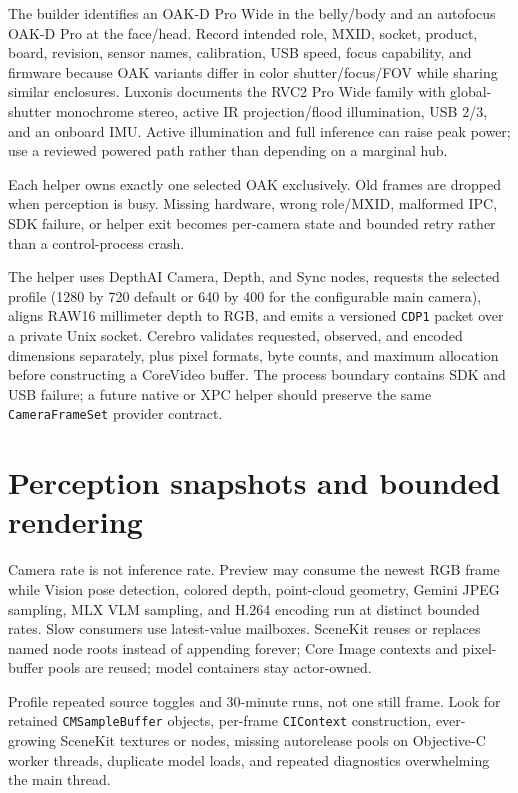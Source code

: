 \documentclass[10pt,openany]{book}
\begin{document}
The builder identifies an OAK-D Pro Wide in the belly/body and an autofocus OAK-D Pro at the face/head. Record intended role, MXID, socket, product, board, revision, sensor names, calibration, USB speed, focus capability, and firmware because OAK variants differ in color shutter/focus/FOV while sharing similar enclosures. Luxonis documents the RVC2 Pro Wide family with global-shutter monochrome stereo, active IR projection/flood illumination, USB 2/3, and an onboard IMU. Active illumination and full inference can raise peak power; use a reviewed powered path rather than depending on a marginal hub.

Each helper owns exactly one selected OAK exclusively. Old frames are dropped when perception is busy. Missing hardware, wrong role/MXID, malformed IPC, SDK failure, or helper exit becomes per-camera state and bounded retry rather than a control-process crash.

The helper uses DepthAI Camera, Depth, and Sync nodes, requests the selected profile (1280 by 720 default or 640 by 400 for the configurable main camera), aligns RAW16 millimeter depth to RGB, and emits a versioned \texttt{CDP1} packet over a private Unix socket. Cerebro validates requested, observed, and encoded dimensions separately, plus pixel formats, byte counts, and maximum allocation before constructing a CoreVideo buffer. The process boundary contains SDK and USB failure; a future native or XPC helper should preserve the same \texttt{CameraFrameSet} provider contract.

\section{Perception snapshots and bounded rendering}

Camera rate is not inference rate. Preview may consume the newest RGB frame while Vision pose detection, colored depth, point-cloud geometry, Gemini JPEG sampling, MLX VLM sampling, and H.264 encoding run at distinct bounded rates. Slow consumers use latest-value mailboxes. SceneKit reuses or replaces named node roots instead of appending forever; Core Image contexts and pixel-buffer pools are reused; model containers stay actor-owned.

Profile repeated source toggles and 30-minute runs, not one still frame. Look for retained \texttt{CMSampleBuffer} objects, per-frame \texttt{CIContext} construction, ever-growing SceneKit textures or nodes, missing autorelease pools on Objective-C worker threads, duplicate model loads, and repeated diagnostics overwhelming the main thread.
\end{document}
